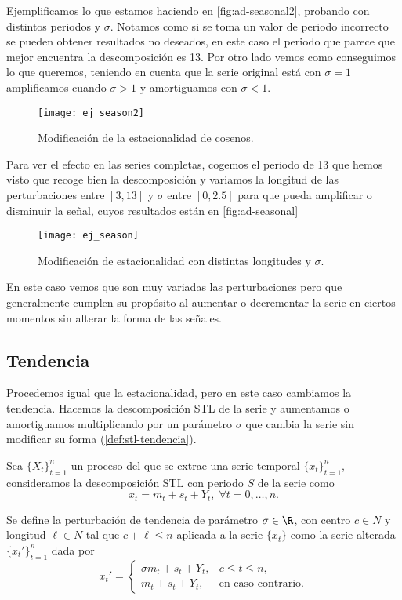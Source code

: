 Ejemplificamos lo que estamos haciendo en \autoref{fig:ad-seasonal2}, probando con distintos periodos y $\sigma$. Notamos como si se toma un valor de periodo incorrecto se pueden obtener resultados no deseados, en este caso el periodo que parece que mejor encuentra la descomposición es 13. Por otro lado vemos como conseguimos lo que queremos, teniendo en cuenta que la serie original está con $\sigma = 1$ amplificamos cuando $\sigma > 1$ y amortiguamos con $\sigma < 1$.

\begin{figure}[htpb]
  \centering
  \texttt{[image: ej\_season2]}
  \caption{Modificación de la estacionalidad de cosenos.}
  \label{fig:ad-seasonal2}
\end{figure}

Para ver el efecto en las series completas, cogemos el periodo de 13 que hemos visto que recoge bien la descomposición y variamos la longitud de las perturbaciones entre $[3, 13]$ y $\sigma$ entre $[0, 2.5]$ para que pueda amplificar o disminuir la señal, cuyos resultados están en \autoref{fig:ad-seasonal}

\begin{figure}[htpb]
  \centering
  \texttt{[image: ej\_season]}
  \caption{Modificación de estacionalidad con distintas longitudes y $\sigma$.}
  \label{fig:ad-seasonal}
\end{figure}

En este caso vemos que son muy variadas las perturbaciones pero que generalmente cumplen su propósito al aumentar o decrementar la serie en ciertos momentos sin alterar la forma de las señales.

\subsection{Tendencia}

Procedemos igual que la estacionalidad, pero en este caso cambiamos la tendencia. Hacemos la descomposición STL de la serie y aumentamos o amortiguamos multiplicando por un parámetro $\sigma$ que cambia la serie sin modificar su forma (\autoref{def:stl-tendencia}).

\begin{definicion}
  Sea $\{X_t\}_{t = 1}^n$ un proceso del que se extrae una serie temporal $\{x_t\}_{t = 1}^n$, consideramos la descomposición STL con periodo $S$ de la serie como
  $$x_t = m_t + s_t + Y_t, \; \forall t = 0, \ldots, n.$$

  Se define la perturbación de tendencia de parámetro $\sigma \in \R$, con centro $c \in N$ y longitud $\ell \in N$ tal que $c + \ell \leq n$ aplicada a la serie $\{x_t\}$ como la serie alterada $\{x_t'\}_{t = 1}^n$ dada por
  $$x_t' = \begin{cases}
    \sigma m_t + s_{t} + Y_t, & c \leq t \leq n, \\
    m_t + s_t + Y_t, & \text{en caso contrario.}
  \end{cases}$$
  \label{def:stl-tendencia}
\end{definicion}


